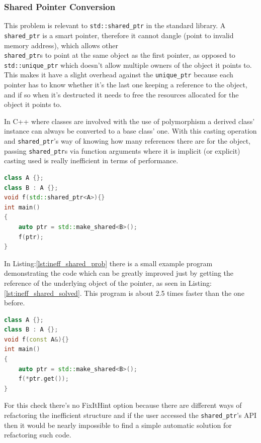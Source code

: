 \subsubsection{Shared Pointer Conversion}
\par This problem is relevant to \verb|std::shared_ptr| in the standard library. A \verb|shared_ptr| is a smart pointer, therefore it cannot dangle (point to invalid memory address), which allows other \\\verb|shared_ptr|s to point at the same object as the first pointer, as opposed to \\ \verb|std::unique_ptr| which doesn't allow multiple owners of the object it points to. This makes it have a slight overhead against the \verb|unique_ptr| because each pointer has to know whether it's the last one keeping a reference to the object, and if so when it's destructed it needs to free the resources allocated for the object it points to. \medskip
\par In C++ where classes are involved with the use of polymorphism a derived class' instance can always be converted to a base class' one. With this casting operation and \verb|shared_ptr|'s way of knowing how many references there are for the object, passing \verb|shared_ptr|s via function arguments where it is implicit (or explicit) casting used is really inefficient in terms of performance. \medskip
\begin{lstlisting}[language=c++, frame=single ,caption={Inefficient implicit cast}, label={lst:ineff_shared_prob}]
class A {};
class B : A {};
void f(std::shared_ptr<A>){}
int main()
{
	auto ptr = std::make_shared<B>();
	f(ptr);
}
\end{lstlisting}
\par In Listing:\ref{lst:ineff_shared_prob} there is a small example program demonstrating the code which can be greatly improved just by getting the reference of the underlying object of the pointer, as seen in Listing:\ref{lst:ineff_shared_solved}. This program is about 2.5 times faster than the one before.
\begin{lstlisting}[language=c++, frame=single ,caption={A much faster version}, label={lst:ineff_shared_solved}]
class A {};
class B : A {};
void f(const A&){}
int main()
{
	auto ptr = std::make_shared<B>();
	f(*ptr.get());
}
\end{lstlisting}
\par For this check there's no FixItHint option because there are different ways of refactoring the inefficient structure and if the user accessed the \verb|shared_ptr|'s API then it would be nearly impossible to find a simple automatic solution for refactoring such code.
